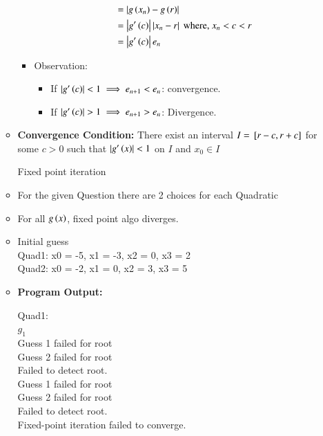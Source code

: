 \documentclass[journal]{IEEEtran}
\numberwithin{equation}{enumi}
\numberwithin{figure}{enumi}
\begin{document}
\begin{enumerate}
\begin{itemize}
\begin{itemize}
\begin{align}
                &= \left\vert g\left(x_n\right) - g\left(r\right)\right\vert\\
                &= \left\vert g^{\prime}\left(c\right)\right\vert \left\vert x_n - r\right\vert \text{ where, } x_n < c < r\\
                &= \left\vert g^{\prime}\left(c\right)\right\vert e_n
            \end{align}
            \item Observation: 
            \begin{itemize}
                \item If $\left\vert g^{\prime}\left(c\right)\right\vert < 1 \implies e_{n + 1} < e_n $: convergence.
                \item If $\left\vert g^{\prime}\left(c\right)\right\vert > 1 \implies e_{n + 1} > e_n $: Divergence.
            \end{itemize}
        \end{itemize}
        \item \textbf{Convergence Condition:} 
        There exist an interval $ I = {}\left[r - c, r + c\right]$ for some $c > 0$ such that $\left\vert g^{\prime}\left(x\right)\right\vert < 1$ on $I$ and $x_0 \in I$
        \begin{table}[!ht]
            \centering
            
            \caption{Fixed point iteration}
            \label{fpi}
        \end{table}
        \item For the given Question there are 2 choices for each Quadratic
        \item For all $g\left(x\right)$, fixed point algo diverges.
        \item Initial guess\\
        Quad1: x0 = -5, x1 = -3, x2 = 0, x3 = 2\\
        Quad2: x0 = -2, x1 = 0, x2 = 3, x3 = 5
        \item \textbf{Program Output:}
        \begin{multicols}{2}
        Quad1:\\
        $g_1$\\
        Guess 1 failed for root\\
        Guess 2 failed for root\\
        Failed to detect root.\\
        Guess 1 failed for root\\
        Guess 2 failed for root\\
        Failed to detect root.\\
        Fixed-point iteration failed to converge.\\

\end{multicols}
\end{itemize}
\end{enumerate}
\end{document}
